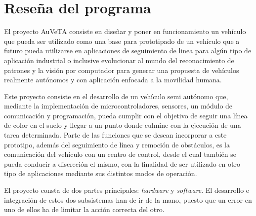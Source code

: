 \section{Reseña del programa}

El proyecto AuVeTA consiste en diseñar y poner en funcionamiento un vehículo que pueda ser utilizado como una base para prototipado de un vehículo que a futuro pueda utilizarse en aplicaciones de seguimiento de linea para algún tipo de aplicación industrial o inclusive evolucionar al mundo del reconocimiento de patrones y la visión por computador para generar una propuesta de vehículos realmente autónomos y con aplicación enfocada a la movilidad humana.

Este proyecto consiste en el desarrollo de un vehículo semi autónomo que, mediante la implementación de microcontroladores, sensores, un módulo de comunicación y programación, pueda cumplir con el objetivo de seguir una línea de color en el suelo y llegar a un punto donde culmine con la ejecución de una tarea determinada. Parte de las funciones que se desean incorporar a este prototipo, además del seguimiento de línea y remoción de obstáculos, es la comunicación del vehículo con un centro de control, desde el cual también se pueda conducir a discreción el mismo, con la finalidad de ser utilizado en otro tipo de aplicaciones mediante sus distintos modos de operación.

El proyecto consta de dos partes principales: \textit{hardware} y \textit{software}. El desarrollo e integración de estos dos subsistemas han de ir de la mano, puesto que un error en uno de ellos ha de limitar la acción correcta del otro.